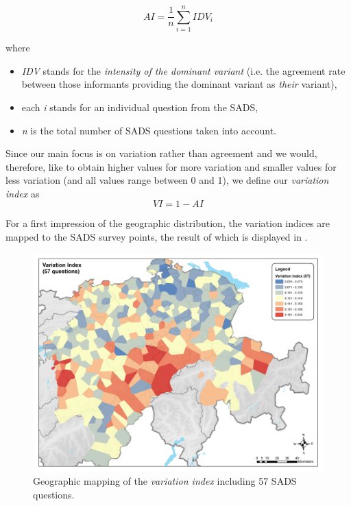 \documentclass[output=paper]{LSP/langsci}
\begin{document}
\begin{equation}
\mathit{AI}=\frac{1}{n}\sum _{i=1}^{n}{{\mathit{IDV}}_{i}}
\end{equation}

where

\begin{itemize}
\item \emph{IDV} stands for the \emph{intensity of the dominant variant} (i.e. the agreement rate between those informants providing the dominant variant as \emph{their} variant),

\item each \emph{i} stands for an individual question from the SADS,

\item \emph{n} is the total number of SADS questions taken into account.

\end{itemize}

Since our main focus is on variation rather than agreement and we would, therefore, like to obtain higher values for more variation and smaller values for less variation (and all values range between 0 and 1), we define our \emph{variation index} as\\
\begin{equation}
\mathit{VI}=1-\mathit{AI}
\end{equation}

For a first impression of the geographic distribution, the variation indices are mapped to the SADS survey points, the result of which is displayed in .

\begin{figure}
\includegraphics[width=\textwidth]{illustrations/stoeck_fig5}
\caption{Geographic mapping of the \emph{variation index} including 57 SADS questions.}
\label{fig:stoeck:5}
\end{figure}
\end{document}
